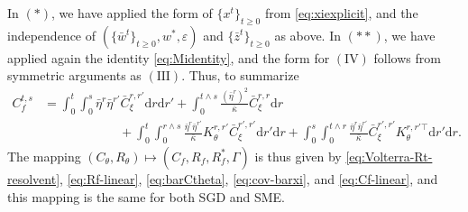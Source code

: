 \documentclass[11pt,letterpaper,reqno]{amsart}
\theoremstyle{definition}
\def\eps{\varepsilon}
\def\d{\mathrm{d}}
\begin{document}
In $(*)$, we have applied the form of $\{x^t\}_{t \geq 0}$ from
\eqref{eq:xiexplicit}, and the independence of $(\{\bar w^t\}_{t \geq
0},w^*,\eps)$ and $\{\bar z^t\}_{t \geq 0}$ as above. In $(**)$, we have applied
again the identity \eqref{eq:Midentity}, and the form for $(\mathrm{IV})$
follows from symmetric arguments as $(\mathrm{III})$. Thus, to summarize
\begin{equation}\label{eq:Cf-linear}
\begin{aligned}
C_f^{t,s}&=\int_0^t \int_0^s \bar\eta^r\bar\eta^{r'}\bar C_\xi^{r,r'}\d r \d r'
+\int_0^{t\wedge s} \frac{(\bar\eta^{r})^2}{\bar\kappa}\bar C_\xi^{r,r}\d r\\
&\hspace{1in}
+\int_0^t \int_0^{r\wedge s} \frac{\bar\eta^r\bar\eta^{r'}}{\bar\kappa}
K_\theta^{r,r'}\bar C_\xi^{r',r'} \d {r'}\d r
+\int_0^s \int_0^{t \wedge r} \frac{\bar\eta^r\bar \eta^{r'}}{\bar\kappa} 
\bar C_\xi^{r',r'}K_\theta^{r,r'\top}\d r'\d r.
\end{aligned}
\end{equation}
The mapping $(C_\theta,R_\theta) \mapsto (C_f, R_f, R_f^*, \Gamma)$ is thus
given by \eqref{eq:Volterra-Rt-resolvent},
\eqref{eq:Rf-linear}, \eqref{eq:barCtheta}, \eqref{eq:cov-barxi},
and \eqref{eq:Cf-linear}, and this mapping is the same for both SGD and SME.
\end{document}
